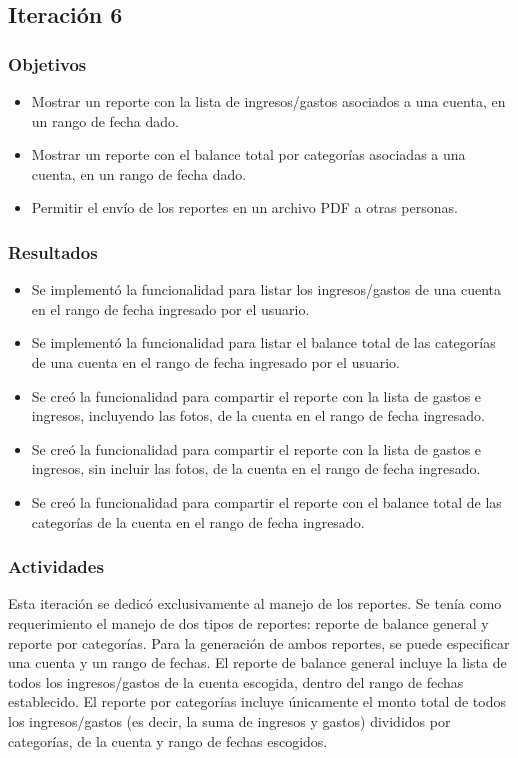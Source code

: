 \subsection{Iteración 6}
\subsubsection{Objetivos}
\begin{itemize}
\item Mostrar un reporte con la lista de ingresos/gastos asociados a una cuenta, en un rango de fecha dado.
\item Mostrar un reporte con el balance total por categorías asociadas a una cuenta, en un rango de fecha dado.
\item Permitir el envío de los reportes en un archivo PDF a otras personas.

\end{itemize}

\subsubsection{Resultados}
\begin{itemize}
\item Se implementó la funcionalidad para listar los ingresos/gastos de una cuenta en el rango de fecha ingresado por el usuario.
\item Se implementó la funcionalidad para listar el balance total de las categorías de una cuenta en el rango de fecha ingresado por el usuario.
\item Se creó la funcionalidad para compartir el reporte con la lista de gastos e ingresos, incluyendo las fotos, de la cuenta en el rango de fecha ingresado.
\item Se creó la funcionalidad para compartir el reporte con la lista de gastos e ingresos, sin incluir las fotos, de la cuenta en el rango de fecha ingresado.
\item Se creó la funcionalidad para compartir el reporte con el balance total de las categorías de la cuenta en el rango de fecha ingresado.
\end{itemize}

\subsubsection{Actividades}
Esta iteración se dedicó exclusivamente al manejo de los reportes. Se tenía como requerimiento el manejo de dos tipos de reportes: reporte de balance general y reporte por categorías. Para la generación de ambos reportes, se puede especificar una cuenta y un rango de fechas. El reporte de balance general incluye la lista de todos los ingresos/gastos de la cuenta escogida, dentro del rango de fechas establecido. El reporte por categorías incluye únicamente el monto total de todos los ingresos/gastos (es decir, la suma de ingresos y gastos) divididos por categorías, de la cuenta y rango de fechas escogidos.

